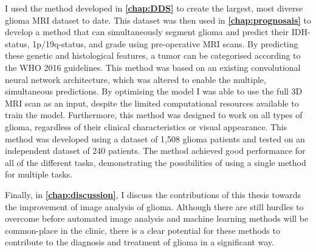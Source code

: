 I used the method developed in \textbf{\cref{chap:DDS}} to create the largest, most diverse glioma \gls{MRI} dataset to date.
This dataset was then used in \textbf{\cref{chap:prognosais}} to develop a method that can simultaneously segment glioma and predict their \gls{IDH}-status, 1p/19q-status, and grade using pre-operative \gls{MRI} scans.
By predicting these genetic and histological features, a \gls{tumor} can be categorised according to the \gls{WHO} 2016 guidelines.
This method was based on an existing convolutional neural network architecture, which was altered to enable the multiple, simultaneous predictions.
By optimising the model I was able to use the full 3D \gls{MRI} scan as an input, despite the limited computational resources available to train the model.
Furthermore, this method was designed to work on all types of glioma, regardless of their clinical characteristics or visual appearance.
This method was developed using a dataset of 1,508 glioma patients and tested on an independent dataset of 240 patients.
The method achieved good performance for all of the different tasks, demonstrating the possibilities of using a single method for multiple tasks.

Finally, in \textbf{\cref{chap:discussion}}, I discuss the contributions of this thesis towards the improvement of image analysis of glioma.
Although there are still hurdles to overcome before automated image analysis and machine learning methods will be common-place in the clinic, there is a clear potential for these methods to contribute to the diagnosis and treatment of glioma in a significant way.
